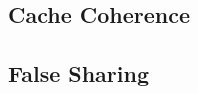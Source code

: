 \documentclass[a4paper,numbers=noenddot]{scrartcl}
\begin{document}
\subsection{Cache Coherence} %

\subsection{False Sharing}

\clearpage
\begin{appendices} %
   
   
   
\end{appendices}

\clearpage

\printglossary[type=\acronymtype] %

\printbibliography[heading=bibintoc]
\end{document}
